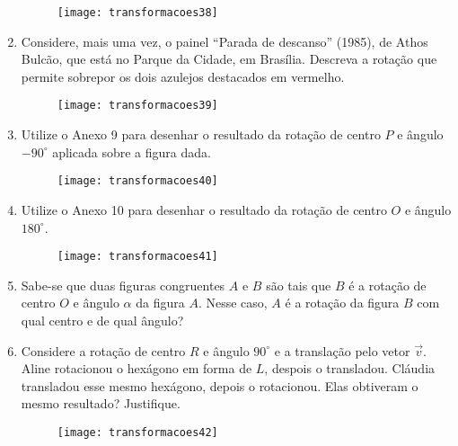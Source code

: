 \begin{enumerate}
\begin{figure}[H]
\centering

\texttt{[image: transformacoes38]}
\end{figure}


\item Considere, mais uma vez, o painel “Parada de descanso” (1985), de Athos Bulcão, que está no Parque da Cidade, em Brasília. Descreva a rotação que permite sobrepor os dois azulejos destacados em vermelho. 

\begin{figure}[H]
\centering

\texttt{[image: transformacoes39]}
\end{figure}


\item Utilize o Anexo 9 para desenhar o resultado da rotação de centro $P$ e ângulo $-90^{\circ}$ aplicada sobre a figura dada. 

\begin{figure}[H]
\centering

\texttt{[image: transformacoes40]}
\end{figure}

\needspace{4em}

\item Utilize o Anexo 10 para desenhar o resultado da rotação de centro $O$ e ângulo $180^{\circ}$. 

\begin{figure}[H]
\centering

\texttt{[image: transformacoes41]}
\end{figure}

\item Sabe-se que duas figuras congruentes $A$ e $B$ são tais que $B$ é a rotação de centro $O$ e ângulo $\alpha$ da figura $A$. Nesse caso, $A$ é a rotação da figura $B$ com qual centro e de qual ângulo?


\item Considere a rotação de centro $R$ e ângulo $90^{\circ}$ e a translação pelo vetor $\overrightarrow{v}$. Aline rotacionou o hexágono em forma de $L$, despois o transladou. Cláudia transladou esse mesmo hexágono, depois o rotacionou. Elas obtiveram o mesmo resultado? Justifique.

\begin{figure}[H]
\centering

\texttt{[image: transformacoes42]}
\end{figure}
\end{enumerate}


